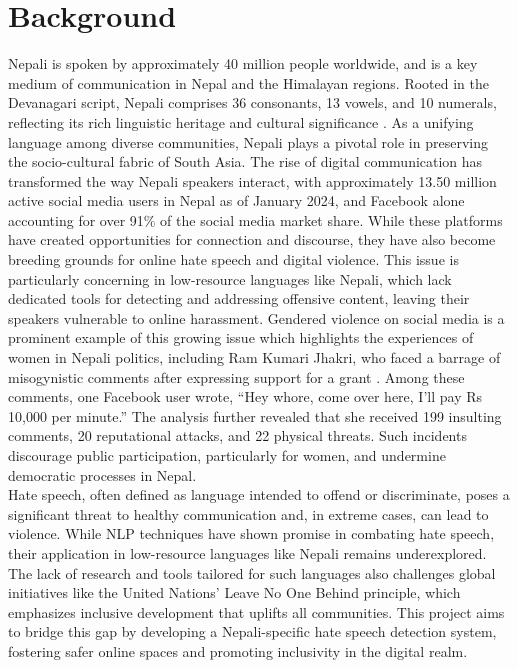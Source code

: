 \section{Background}\label{sec:bkgrnd}%
Nepali is  spoken by approximately 40 million people worldwide, and is a key medium of communication in Nepal and  the Himalayan regions. Rooted in the Devanagari script, Nepali comprises 36 consonants, 13 vowels, and 10 numerals, reflecting its rich linguistic heritage and cultural significance \cite{thapa2023nehate}. As a unifying language among diverse communities, Nepali plays a pivotal role in preserving the socio-cultural fabric of South Asia.
The rise of digital communication has transformed the way Nepali speakers interact, with approximately 13.50 million active social media users in Nepal as of January 2024, and Facebook alone accounting for over 91\% of the social media market share. While these platforms have created opportunities for connection and discourse, they have also become breeding grounds for online hate speech and digital violence. This issue is particularly concerning in low-resource languages like Nepali, which lack dedicated tools for detecting and addressing offensive content, leaving their speakers vulnerable to online harassment.
Gendered violence on social media is a prominent example of this growing issue which highlights the experiences of women in Nepali politics, including Ram Kumari Jhakri, who faced a barrage of misogynistic comments after expressing support for a grant \cite{women}. Among these comments, one Facebook user wrote, “Hey whore, come over here, I’ll pay Rs 10,000 per minute.” The analysis further revealed that she received 199 insulting comments, 20 reputational attacks, and 22 physical threats. Such incidents discourage public participation, particularly for women, and undermine democratic processes in Nepal.\\
Hate speech, often defined as language intended to offend or discriminate, poses a significant threat to healthy communication and, in extreme cases, can lead to violence. While NLP techniques have shown promise in combating hate speech, their application in low-resource languages like Nepali remains underexplored. The lack of research and tools tailored for such languages also challenges global initiatives like the United Nations’ Leave No One Behind principle, which emphasizes inclusive development that uplifts all communities. This project aims to bridge this gap by developing a Nepali-specific hate speech detection system, fostering safer online spaces and promoting inclusivity in the digital realm.
      
